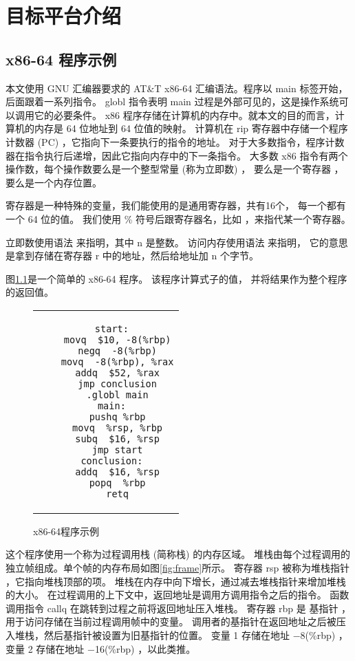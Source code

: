 
\chapter{目标平台介绍}

\section{x86-64 程序示例}

本文使用 GNU 汇编器要求的 AT\&T x86-64 汇编语法。程序以 main 标签开始，后面跟着一系列指令。
globl 指令表明 main 过程是外部可见的，这是操作系统可以调用它的必要条件。
x86 程序存储在计算机的内存中。就本文的目的而言，计算机的内存是 64 位地址到 64 位值的映射。
计算机在 rip 寄存器中存储一个程序计数器 (PC) ，它指向下一条要执行的指令的地址。
对于大多数指令，程序计数器在指令执行后递增，因此它指向内存中的下一条指令。
大多数 x86 指令有两个操作数，每个操作数要么是一个整型常量 (称为立即数) ，
要么是一个寄存器 ，要么是一个内存位置。

寄存器是一种特殊的变量，我们能使用的是通用寄存器，共有16个，
每一个都有一个 64 位的值。
我们使用 \% 符号后跟寄存器名，比如 ，来指代某一个寄存器。

立即数使用语法  来指明，其中 n 是整数。
访问内存使用语法  来指明，
它的意思是拿到存储在寄存器 r 中的地址，然后给地址加 n 个字节。

图\ref{fig:x86-eg}是一个简单的 x86-64 程序。
该程序计算式子的值，
并将结果作为整个程序的返回值。

\begin{figure}[h]
\begin{center}
\begin{tabular}{c}
\begin{lstlisting}
  start:
    movq  $10, -8(%rbp)
    negq  -8(%rbp)
    movq  -8(%rbp), %rax
    addq  $52, %rax
    jmp conclusion
    .globl main
  main:
    pushq %rbp
    movq  %rsp, %rbp
    subq  $16, %rsp
    jmp start
  conclusion:
    addq  $16, %rsp
    popq  %rbp
    retq
\end{lstlisting}
\end{tabular}
\end{center}

	\caption{x86-64程序示例}
	\label{fig:x86-eg}
\end{figure}



这个程序使用一个称为过程调用栈 (简称栈) 的内存区域。
堆栈由每个过程调用的独立帧组成。单个帧的内存布局如图\ref{fig:frame}所示。
寄存器 rsp 被称为堆栈指针 ，它指向堆栈顶部的项。
堆栈在内存中向下增长，通过减去堆栈指针来增加堆栈的大小。
在过程调用的上下文中，返回地址是调用方调用指令之后的指令。
函数调用指令 callq 在跳转到过程之前将返回地址压入堆栈。
寄存器 rbp 是 基指针 ，用于访问存储在当前过程调用帧中的变量。
调用者的基指针在返回地址之后被压入堆栈，然后基指针被设置为旧基指针的位置。
变量 1 存储在地址 −8(\%rbp) ，变量 2 存储在地址 −16(\%rbp) ，以此类推。

